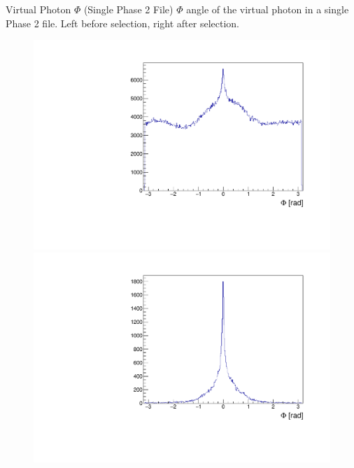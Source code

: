 \documentclass[10pt]{beamer}
\begin{document}



\begin{frame}{Virtual Photon $\Phi$ (Single Phase 2 File)}
	$\Phi$ angle of the virtual photon in a single Phase 2 file. Left before selection, right after selection.
	
	\begin{figure}
		\centering
		\begin{minipage}{.5\textwidth}
			\centering
			\includegraphics[width=\textwidth]{gg/data/Phigg_BS}
			
		\end{minipage}%
		\begin{minipage}{.5\textwidth}
			\centering
			\includegraphics[width=\textwidth]{gg/data/Phigg_AS}
			
		\end{minipage}
	\end{figure}
\end{frame}
\end{document}
